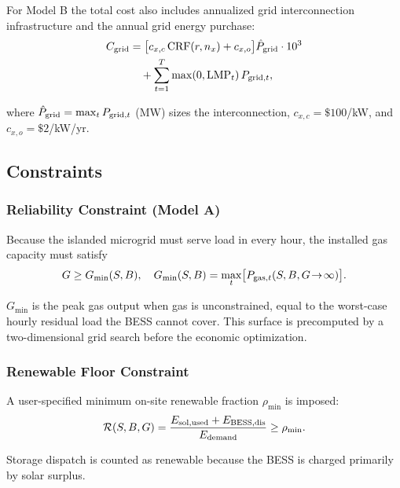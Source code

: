 \documentclass[conference]{IEEEtran}
\begin{document}
For Model B the total cost also includes annualized grid interconnection
infrastructure and the annual grid energy purchase:
%
\begin{equation}
  \begin{split}
    C_{\rm grid}
      &= \bigl[c_{x,c}\,\mathrm{CRF}(r,n_x)+c_{x,o}\bigr]
         \hat{P}_{\rm grid}\cdot 10^3 \\
      &\quad + \sum_{t=1}^{T}\max(0,\mathrm{LMP}_t)\,P_{{\rm grid},t},
  \end{split}
  \label{eq:cgrid}
\end{equation}

\noindent where $\hat{P}_{\rm grid}=\max_t P_{{\rm grid},t}$ (MW) sizes the
interconnection, $c_{x,c}=\$100$/kW, and $c_{x,o}=\$2$/kW/yr.

\subsection{Constraints}

\subsubsection{Reliability Constraint (Model A)}

Because the islanded microgrid must serve load in every hour, the installed
gas capacity must satisfy
%
\begin{equation}
  G \geq G_{\min}(S,B),
  \quad
  G_{\min}(S,B) = \max_{t}\bigl[P_{{\rm gas},t}(S,B,G\!\to\!\infty)\bigr].
  \label{eq:reliability}
\end{equation}

$G_{\min}$ is the peak gas output when gas is unconstrained, equal to the
worst-case hourly residual load the BESS cannot cover.
This surface is precomputed by a two-dimensional grid search before the
economic optimization.

\subsubsection{Renewable Floor Constraint}

A user-specified minimum on-site renewable fraction $\rho_{\min}$ is imposed:
%
\begin{equation}
  \mathcal{R}(S,B,G)
    = \frac{E_{\rm sol,used}+E_{\rm BESS,dis}}{E_{\rm demand}}
    \geq \rho_{\min}.
  \label{eq:ren_floor}
\end{equation}

\noindent Storage dispatch is counted as renewable because the BESS is charged
primarily by solar surplus.
\end{document}

